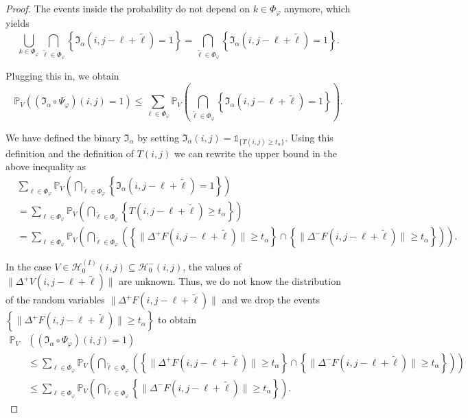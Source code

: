 \documentclass[a4paper,12pt]{article}
\newcommand{\norm}[1]{\lVert#1\rVert}
\theoremstyle{plain}
\theoremstyle{definition}
\numberwithin{equation}{section}
\begin{document}
\begin{proof}
	The events inside the probability do not depend on $k \in \Phi_\varphi$ anymore, which yields
	\begin{equation*}
		\bigcup_{k \in \Phi_\varphi} \bigcap_{\tilde{\ell} \in \Phi_\varphi} \left\{ \mathfrak{I}_\alpha(i, j - \ell + \tilde{\ell}) = 1 \right\} = \bigcap_{\tilde{\ell} \in \Phi_\varphi} \left\{ \mathfrak{I}_\alpha(i, j - \ell + \tilde{\ell}) = 1 \right\}.
	\end{equation*}
	
	Plugging this in, we obtain
	\begin{equation*}
		\mathbb{P}_V\left( (\mathfrak{I}_\alpha \circ \Psi_\varphi)(i, j) = 1 \right) \leq \sum_{\ell \in \Phi_\varphi} \mathbb{P}_V\left( \bigcap_{\tilde{\ell} \in \Phi_\varphi} \left\{ \mathfrak{I}_\alpha(i, j - \ell + \tilde{\ell}) = 1 \right\} \right).
	\end{equation*}
	
	We have defined the binary $\mathfrak{I}_\alpha$ by setting $\mathfrak{I}_\alpha(i, j) = \mathds{1}_{ \{ T(i, j) \geq t_\alpha \} }$. Using this definition and the definition of $T(i, j)$ we can rewrite the upper bound in the above inequality as
	\begin{align*}
		&\sum_{\ell \in \Phi_\varphi} \mathbb{P}_V\left( \bigcap_{\tilde{\ell} \in \Phi_\varphi} \left\{ \mathfrak{I}_\alpha(i, j - \ell + \tilde{\ell}) = 1 \right\} \right) \\
		&= \sum_{\ell \in \Phi_\varphi} \mathbb{P}_V\left( \bigcap_{\tilde{\ell} \in \Phi_\varphi} \left\{ T(i, j - \ell + \tilde{\ell}) \geq t_\alpha \right\} \right) \\
		&= \sum_{\ell \in \Phi_\varphi} \mathbb{P}_V\left( \bigcap_{\tilde{\ell} \in \Phi_\varphi} \left( \left\{ \norm{\Delta^+ F(i, j - \ell + \tilde{\ell})} \geq t_\alpha \right\} \cap \left\{ \norm{\Delta^- F(i, j - \ell + \tilde{\ell})} \geq t_\alpha \right\} \right) \right).
	\end{align*}
	
	In the case $V \in \mathcal{H}_0^{(I)}(i, j) \subseteq \mathcal{H}_0^-(i, j)$, the values of $\norm{\Delta^+ V(i, j - \ell + \tilde{\ell})}$ are unknown. Thus, we do not know the distribution of the random variables $\norm{\Delta^+ F(i, j - \ell + \tilde{\ell})}$ and we drop the events $\left\{ \norm{\Delta^+ F(i, j - \ell + \tilde{\ell})} \geq t_\alpha \right\}$ to obtain
	\begin{align*}
		\mathbb{P}_V&\left( (\mathfrak{I}_\alpha \circ \Psi_\varphi)(i, j) = 1 \right) \\
		&\leq \sum_{\ell \in \Phi_\varphi} \mathbb{P}_V\left( \bigcap_{\tilde{\ell} \in \Phi_\varphi} \left( \left\{ \norm{\Delta^+ F(i, j - \ell + \tilde{\ell})} \geq t_\alpha \right\} \cap \left\{ \norm{\Delta^- F(i, j - \ell + \tilde{\ell})} \geq t_\alpha \right\} \right) \right) \\
		&\leq \sum_{\ell \in \Phi_\varphi} \mathbb{P}_V\left( \bigcap_{\tilde{\ell} \in \Phi_\varphi} \left\{ \norm{\Delta^- F(i, j - \ell + \tilde{\ell})} \geq t_\alpha \right\} \right).
	\end{align*}
	

\end{proof}
\end{document}

